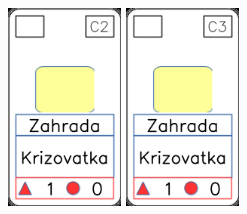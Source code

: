 \documentclass[a4paper]{article}
\begin{document}
	\includegraphics[width=3.0cm]{img-3_26}
	\includegraphics[width=3.0cm]{img-3_27}
\end{document}
